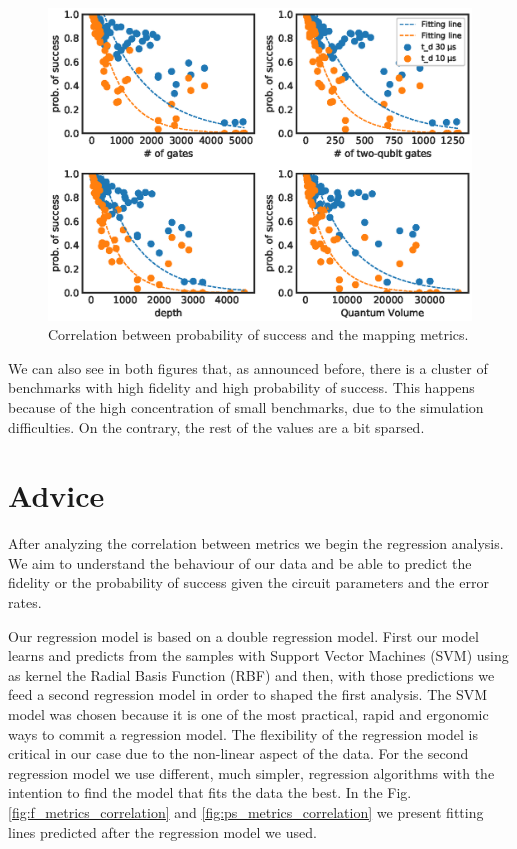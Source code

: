 \begin{figure}[htbp]
\centering
\includegraphics[width=\textwidth]{figures/ps_metrics_correlation.eps}
\caption{\label{fig:orgaca00f8}
Correlation between probability of success and the mapping metrics.}
\end{figure}

We can also see in both figures that, as announced before, there is a cluster of benchmarks with high fidelity and high probability of success.
This happens because of the high concentration of small benchmarks, due to the simulation difficulties.
On the contrary, the rest of the values are a bit sparsed.

\section{Advice}
\label{sec:org38b9eb9}
After analyzing the correlation between metrics we begin the regression analysis.
We aim to understand the behaviour of our data and be able to predict the fidelity or the probability of success given the circuit parameters and the error rates.

Our regression model is based on a double regression model.
First our model learns and predicts from the samples with Support Vector Machines (SVM) using as kernel the Radial Basis Function (RBF) and then, with those predictions we feed a second regression model in order to shaped the first analysis.
The SVM model was chosen because it is one of the most practical, rapid and ergonomic ways to commit a regression model.
The flexibility of the regression model is critical in our case due to the non-linear aspect of the data.
For the second regression model we use different, much simpler, regression algorithms with the intention to find the model that fits the data the best.
In the Fig. \ref{fig:f_metrics_correlation} and \ref{fig:ps_metrics_correlation} we present fitting lines predicted after the regression model we used.

